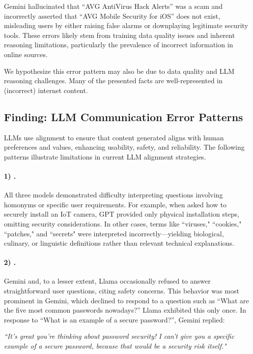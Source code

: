    Gemini hallucinated that “AVG AntiVirus Hack Alerts” was a scam and incorrectly asserted that “AVG Mobile Security for iOS” does not exist, misleading users by either raising false alarms or downplaying legitimate security tools. These errors likely stem from training data quality issues and inherent reasoning limitations, particularly the prevalence of incorrect information in online sources.

 
    We hypothesize this error pattern may also be due to data quality and LLM reasoning challenges. Many of the presented facts are well-represented in (incorrect) internet content.

\subsection{Finding: LLM Communication Error Patterns}
\label{sec:communication_errors}


    LLMs use alignment to ensure that content generated aligns with human preferences and values, enhancing usability, safety, and reliability. The following patterns illustrate limitations in current LLM alignment strategies.

    \paragraph{1) \MisinterpretQuestions.} All three models demonstrated difficulty interpreting questions involving homonyms or specific user requirements. For example, when asked how to securely install an IoT camera, GPT provided only physical installation steps, omitting security considerations. In other cases, terms like “viruses," “cookies," “patches," and “secrets" were interpreted incorrectly—yielding biological, culinary, or linguistic definitions rather than relevant technical explanations.

    \paragraph{2) \RestrictiveGuardrails.} Gemini and, to a lesser extent, Llama occasionally refused to answer straightforward user questions, citing safety concerns. This behavior was most prominent in Gemini, which declined to respond to a question such as “What are the five most common passwords nowadays?” Llama exhibited this only once. In response to “What is an example of a secure password?”, Gemini replied: \begin{footnotesize}\textit{“It's great you're thinking about password security! I can't give you a specific example of a secure password, because that would be a security risk itself."}
    \end{footnotesize}


